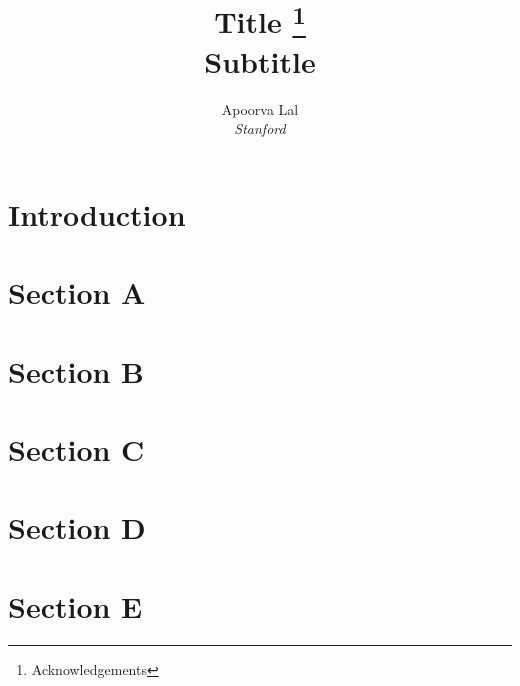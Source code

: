 \documentclass[a4paper, 12pt]{article}
\title{Title \thanks{Acknowledgements \updateinfo } \\
  \large Subtitle}
\author{
  Apoorva Lal \\
  \emph{Stanford}
}
\begin{document}
\begin{titlingpage}
    \maketitle
    \begin{abstract}
        \lipsum[4]
    \end{abstract}
\end{titlingpage}


\section*{Introduction}


\cite{Deatonanalysishouseholdsurveys1997}

\parencite{Acemoglucolonialoriginscomparative2001}


\section{Section A}
\lipsum[2]

\section{Section B}
\lipsum[3]

\section{Section C}
\lipsum[3]

\section{Section D}
\lipsum[4]

\section{Section E}
\lipsum[7]

\renewcommand{\mkbibnamefamily}[1]{\textsc{#1}} %
\printbibliography
\end{document}
